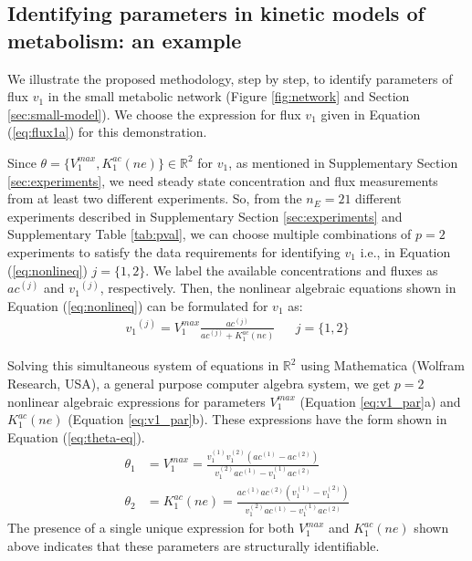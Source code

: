 \documentclass[10pt]{article}
\begin{document}
	\subsection{Identifying parameters in kinetic models of metabolism: an example}\label{sec:example}	
	We illustrate the proposed methodology, step by step, to identify parameters of flux $v_1$ in the small metabolic network (Figure \ref{fig:network} and Section \ref{sec:small-model}). We choose the expression for flux $v_1$ given in Equation (\ref{eq:flux1a}) for this demonstration. 
	
	Since $\theta = \{V_1^{max}, K_1^{ac} (ne)\} \in \mathbb{R}^2$ for $v_1$, as mentioned in Supplementary Section \ref{sec:experiments}, we need steady state concentration and flux measurements from at least two different experiments. So, from the $n_E = 21$ different experiments described in Supplementary Section \ref{sec:experiments} and Supplementary Table \ref{tab:pval}, we can choose multiple combinations of $p = 2$ experiments to satisfy the data requirements for identifying $v_1$ i.e., in Equation (\ref{eq:nonlineq}) $j = \{1, 2\}$. We label the available concentrations and fluxes as ${ac}^{(j)}$ and ${v_1}^{(j)}$, respectively. Then, the nonlinear algebraic equations shown in Equation (\ref{eq:nonlineq}) can be formulated for $v_1$ as:
	\begin{align*}%
	{v_1}^{(j)} = V_{1}^{max}\frac{ac^{(j)}}{ac^{(j)}+K_{1}^{ac}(ne)} &&  j=\{1, 2\}
	\end{align*}
	
	Solving this simultaneous system of equations in $\mathbb{R}^2$ using Mathematica (Wolfram Research, USA), a general purpose computer algebra system, we get $p=2$ nonlinear algebraic expressions for parameters $V_1^{max}$ (Equation \ref{eq:v1_par}a) and $K_1^{ac}(ne)$ (Equation \ref{eq:v1_par}b). These expressions have the form shown in Equation (\ref{eq:theta-eq}).
	\begin{subequations}\label{eq:v1_par}
		\begin{align}		
		\theta_1 &= V_1^{max} = \frac{v_1^{(1)}v_1^{(2)}(ac^{(1)}-ac^{(2)})}{v_1^{(2)}ac^{(1)}-v_1^{(1)}ac^{(2)}}\\
		\theta_2 &= K_1^{ac}(ne) = \frac{ac^{(1)}ac^{(2)}(v_1^{(1)}-v_1^{(2)})}{v_1^{(2)}ac^{(1)}-v_1^{(1)}ac^{(2)}}
		\end{align}
	\end{subequations}
	The presence of a single unique expression for both $V_1^{max}$ and $K_1^{ac} (ne)$ shown above indicates that these parameters are structurally identifiable. 
\end{document}
